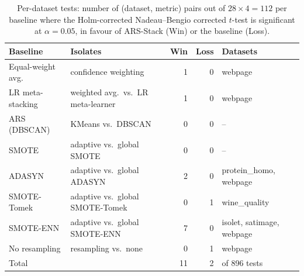 \begin{table}[t]\centering\small
\caption{Per-dataset tests: number of (dataset, metric) pairs out of $28\times4=112$ per baseline where the Holm-corrected Nadeau--Bengio corrected $t$-test is significant at $\alpha=0.05$, in favour of ARS-Stack (Win) or the baseline (Loss).}
\label{tab:sigcounts}
\begin{tabular}{llrrl}
\toprule
Baseline & Isolates & Win & Loss & Datasets \\
\midrule
Equal-weight avg. & confidence weighting & 1 & 0 & webpage \\
LR meta-stacking & weighted avg.\ vs.\ LR meta-learner & 1 & 0 & webpage \\
ARS (DBSCAN) & KMeans vs.\ DBSCAN & 0 & 0 & -- \\
SMOTE & adaptive vs.\ global SMOTE & 0 & 0 & -- \\
ADASYN & adaptive vs.\ global ADASYN & 2 & 0 & protein\_homo, webpage \\
SMOTE-Tomek & adaptive vs.\ global SMOTE-Tomek & 0 & 1 & wine\_quality \\
SMOTE-ENN & adaptive vs.\ global SMOTE-ENN & 7 & 0 & isolet, satimage, webpage \\
No resampling & resampling vs.\ none & 0 & 1 & webpage \\
\midrule
Total & & 11 & 2 & of 896 tests \\
\bottomrule
\end{tabular}
\end{table}